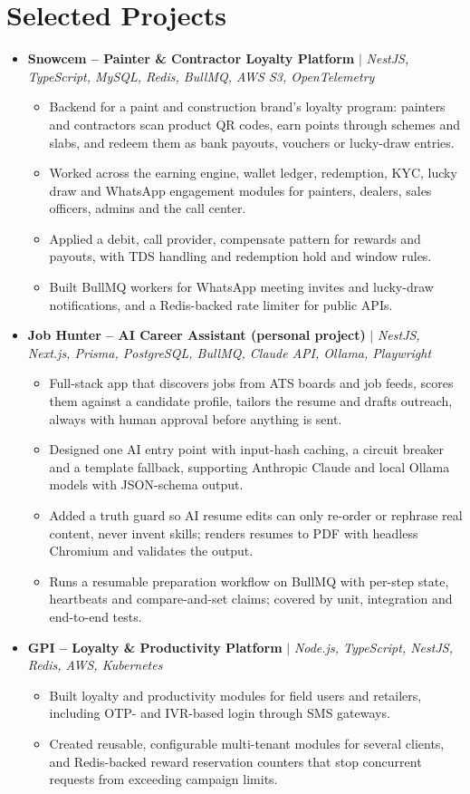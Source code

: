 \documentclass[letterpaper,10pt]{article}
\newcommand{\itemx}[1]{\item\small{#1\vspace{-2pt}}}
\newcommand{\project}[2]{\item \small{\textbf{#1} $|$ \emph{#2}}\vspace{-5pt}}
\begin{document}
\section{Selected Projects}
\begin{itemize}[leftmargin=.15in,label={}]
\project{Snowcem -- Painter \& Contractor Loyalty Platform}{NestJS, TypeScript, MySQL, Redis, BullMQ, AWS S3, OpenTelemetry}
\begin{itemize}[leftmargin=.18in]
\itemx{Backend for a paint and construction brand's loyalty program: painters and contractors scan product QR codes, earn points through schemes and slabs, and redeem them as bank payouts, vouchers or lucky-draw entries.}
\itemx{Worked across the earning engine, wallet ledger, redemption, KYC, lucky draw and WhatsApp engagement modules for painters, dealers, sales officers, admins and the call center.}
\itemx{Applied a debit, call provider, compensate pattern for rewards and payouts, with TDS handling and redemption hold and window rules.}
\itemx{Built BullMQ workers for WhatsApp meeting invites and lucky-draw notifications, and a Redis-backed rate limiter for public APIs.}
\end{itemize}
\project{Job Hunter -- AI Career Assistant (personal project)}{NestJS, Next.js, Prisma, PostgreSQL, BullMQ, Claude API, Ollama, Playwright}
\begin{itemize}[leftmargin=.18in]
\itemx{Full-stack app that discovers jobs from ATS boards and job feeds, scores them against a candidate profile, tailors the resume and drafts outreach, always with human approval before anything is sent.}
\itemx{Designed one AI entry point with input-hash caching, a circuit breaker and a template fallback, supporting Anthropic Claude and local Ollama models with JSON-schema output.}
\itemx{Added a truth guard so AI resume edits can only re-order or rephrase real content, never invent skills; renders resumes to PDF with headless Chromium and validates the output.}
\itemx{Runs a resumable preparation workflow on BullMQ with per-step state, heartbeats and compare-and-set claims; covered by unit, integration and end-to-end tests.}
\end{itemize}
\project{GPI -- Loyalty \& Productivity Platform}{Node.js, TypeScript, NestJS, Redis, AWS, Kubernetes}
\begin{itemize}[leftmargin=.18in]
\itemx{Built loyalty and productivity modules for field users and retailers, including OTP- and IVR-based login through SMS gateways.}
\itemx{Created reusable, configurable multi-tenant modules for several clients, and Redis-backed reward reservation counters that stop concurrent requests from exceeding campaign limits.}

\end{itemize}
\end{itemize}
\end{document}
